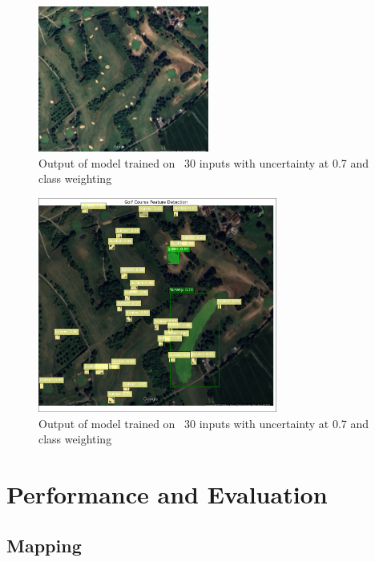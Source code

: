 \documentclass[final]{cmpreport_02}
\begin{document}
\begin{figure}[h!]
	\centering
	\includegraphics[width=0.5\textwidth]{./images/AEEnglishCoursePlain.png}
	\caption{Output of model trained on ~30 inputs with uncertainty at 0.7 and class weighting}
	\label{am:AEEnglishCoursePlain}
\end{figure}


\begin{figure}[h!]
	\centering
	\includegraphics[width=0.7\textwidth]{./images/AEEnglishCourseResult.png}
	\caption{Output of model trained on ~30 inputs with uncertainty at 0.7 and class weighting}
	\label{am:AEEnglishCourseResult}
\end{figure}



\clearpage
\section{Performance and Evaluation}
\subsection{Mapping}


\end{document}
